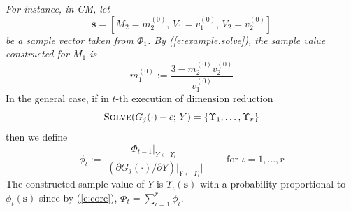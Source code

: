 \documentclass[]{article}
\newcommand{\bvec}[1]{\textbf{#1}}
\newcommand{\pr}{p}
\begin{document}
\emph{For instance, in CM, let 
{\footnotesize$$\bvec{s} = [ M_2 = m_2^{(0)}, \, V_1 = v_1^{(0)}, \, V_2 = v_2^{(0)} ]$$} 
be a sample vector taken from $\Phi_1$. 
By (\ref{e:example.solve}),  
the sample value constructed for $M_1$ is 
{\footnotesize
$$m_1^{(0)} := \frac{3 - m_2^{(0)}v_2^{(0)}}{v_1^{(0)}}$$ 
}
}%
In the general case, if in $t$-th execution of dimension reduction 
{\footnotesize$$\textsc{Solve}(G_j(\cdot)-c ;\, Y) =  \{\Upsilon_1, \ldots, \Upsilon_r \}$$}
then we define
$$
\phi_\iota := 
\frac{\Phi_{t - 1}|_{Y \leftarrow \Upsilon_\iota}}{
\big|(\partial G_j(\cdot) / \partial Y) |_{Y \leftarrow \Upsilon_\iota}
\big|
}
\qquad \text{ for } \iota = 1, \ldots, r
$$ 
The constructed sample value of $Y$ is 
$\Upsilon_\iota(\bvec{s})$ with a probability proportional to $\phi_\iota(\bvec{s})$ 
since by (\ref{e:core}), $\Phi_t = \sum_{\iota=1}^{r} \phi_{\iota}$.
%

%

\end{document}
